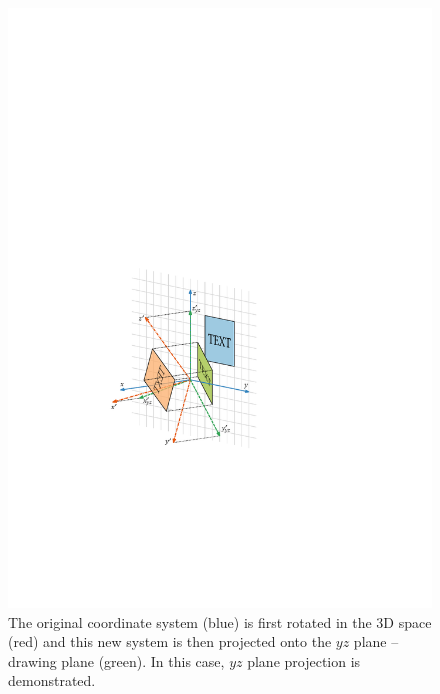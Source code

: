 \documentclass[11pt,a4paper]{article}
\begin{document}

\begin{figure}
\begin{center}
\includegraphics[scale=1]{pdf/projection_explained_1_v2.pdf}
\caption{The original coordinate system (blue) is first rotated in the 3D space (red) and this new system is then projected onto the $yz$ plane -- drawing plane (green). In this case, $yz$ plane projection is demonstrated.}
\label{fig:projection_explained_1}
\end{center}
\end{figure}
\end{document}
